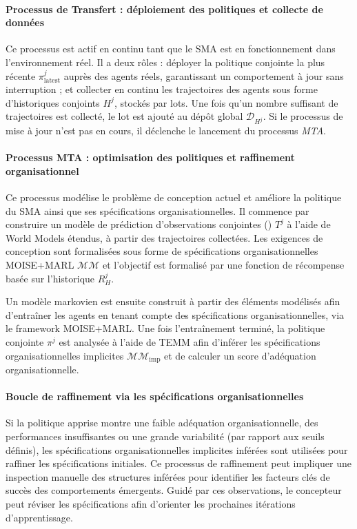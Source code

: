 \paragraph{Processus de Transfert : déploiement des politiques et collecte de données}

Ce processus est actif en continu tant que le \ac{SMA} est en fonctionnement dans l'environnement réel. Il a deux rôles : déployer la politique conjointe la plus récente $\pi^j_{\text{latest}}$ auprès des agents réels, garantissant un comportement à jour sans interruption ; et collecter en continu les trajectoires des agents sous forme d'historiques conjoints $H^j$, stockés par lots. Une fois qu'un nombre suffisant de trajectoires est collecté, le lot est ajouté au dépôt global $\mathcal{D}_{H^j}$. Si le processus de mise à jour n'est pas en cours, il déclenche le lancement du processus \textit{\ac{MTA}}.

\paragraph{Processus MTA : optimisation des politiques et raffinement organisationnel}

Ce processus modélise le problème de conception actuel et améliore la politique du \ac{SMA} ainsi que ses spécifications organisationnelles. Il commence par construire un modèle de prédiction d'observations conjointes () $T^j$ à l'aide de World Models étendus, à partir des trajectoires collectées. Les exigences de conception sont formalisées sous forme de spécifications organisationnelles MOISE+MARL $\mathcal{MM}$ et l'objectif est formalisé par une fonction de récompense basée sur l'historique $R^j_H$.

Un modèle markovien est ensuite construit à partir des éléments modélisés afin d'entraîner les agents en tenant compte des spécifications organisationnelles, via le framework MOISE+MARL. Une fois l'entraînement terminé, la politique conjointe $\pi^j$ est analysée à l'aide de \ac{TEMM} afin d'inférer les spécifications organisationnelles implicites $\mathcal{MM}_{\text{imp}}$ et de calculer un score d'adéquation organisationnelle.

\paragraph{Boucle de raffinement via les spécifications organisationnelles}

Si la politique apprise montre une faible adéquation organisationnelle, des performances insuffisantes ou une grande variabilité (par rapport aux seuils définis), les spécifications organisationnelles implicites inférées sont utilisées pour raffiner les spécifications initiales. Ce processus de raffinement peut impliquer une inspection manuelle des structures inférées pour identifier les facteurs clés de succès des comportements émergents. Guidé par ces observations, le concepteur peut réviser les spécifications afin d'orienter les prochaines itérations d'apprentissage.

